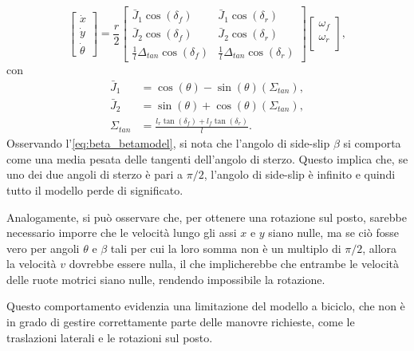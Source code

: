 \begin{equation}
    \begin{bmatrix}
        \dot{x} \\
        \dot{y} \\
        \dot{\theta}
    \end{bmatrix} =
    \frac{r}{2}\begin{bmatrix}
        \bar{J}_1\cos(\delta_f)               &
        \bar{J}_1\cos(\delta_r)                                                       \\
        \bar{J}_2\cos(\delta_f)               &
        \bar{J}_2\cos(\delta_r)                                                       \\
        \frac{1}{l}\Delta_{tan}\cos(\delta_f) & \frac{1}{l}\Delta_{tan}\cos(\delta_r)
    \end{bmatrix}
    \begin{bmatrix}
        \omega_f \\
        \omega_r \\
    \end{bmatrix},
\end{equation}
con
\begin{align}
    \bar{J}_1    & = \cos(\theta)-\sin(\theta)(\Sigma_{tan}), \label{eq:Jbar1}             \\
    \bar{J}_2    & = \sin(\theta)+\cos(\theta)(\Sigma_{tan}), \label{eq:Jbar2}             \\
    \Sigma_{tan} & = \frac{l_r \tan(\delta_f) + l_f \tan(\delta_r)}{l}.\label{eq:Sigmatan}
\end{align}
Osservando l'\cref{eq:beta_betamodel}, si nota che l'angolo di side-slip $\beta$ si comporta come una media pesata delle tangenti dell'angolo di sterzo. Questo implica che, se uno dei due angoli di sterzo è pari a $\pi/2$, l'angolo di side-slip è infinito e quindi tutto il modello perde di significato.

Analogamente, si può osservare che, per ottenere una rotazione sul posto, sarebbe necessario imporre che le velocità lungo gli assi $x$ e $y$ siano nulle, ma se ciò fosse vero per angoli $\theta$ e $\beta$ tali per cui la loro somma non è un multiplo di $\pi/2$, allora la velocità $v$ dovrebbe essere nulla, il che implicherebbe che entrambe le velocità delle ruote motrici siano nulle, rendendo impossibile la rotazione.

\begin{note}
    Questo comportamento evidenzia una limitazione del modello a biciclo, che non è in grado di gestire correttamente parte delle manovre richieste, come le traslazioni laterali e le rotazioni sul posto.
\end{note}

